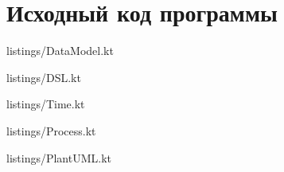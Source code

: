 \chapter{Исходный код программы}
 {listings/DataModel.kt}

 {listings/DSL.kt}


 {listings/Time.kt}

 {listings/Process.kt}

 {listings/PlantUML.kt}